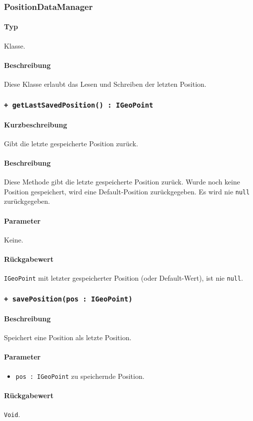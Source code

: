 \subsubsection{PositionDataManager}
\paragraph*{Typ}
Klasse.
\paragraph*{Beschreibung}
Diese Klasse erlaubt das Lesen und Schreiben der letzten Position.

\subsubsection*{\texttt{+ getLastSavedPosition() : IGeoPoint}}%
\paragraph*{Kurzbeschreibung}
Gibt die letzte gespeicherte Position zurück.
\paragraph*{Beschreibung}
Diese Methode gibt die letzte gespeicherte Position zurück. Wurde noch keine Position gespeichert,
wird eine Default-Position zurückgegeben. Es wird nie \texttt{null} zurückgegeben.
\paragraph*{Parameter}
Keine.
\paragraph*{Rückgabewert}
\texttt{IGeoPoint} mit letzter gespeicherter Position (oder Default-Wert), ist nie \texttt{null}.

\subsubsection*{\texttt{+ savePosition(pos : IGeoPoint)}}%
\paragraph*{Beschreibung}
Speichert eine Position als letzte Position.
\paragraph*{Parameter}
\begin{itemize}
    \item \texttt{pos : IGeoPoint} zu speichernde Position.
\end{itemize}
\paragraph*{Rückgabewert}
\texttt{Void}.

